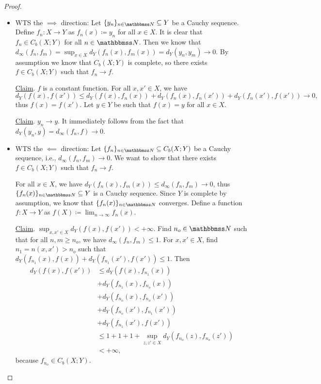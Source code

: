 \documentclass[screen,single]{techreport}
\numberwithin{equation}{section}
\begin{document}
\begin{proof}\
  \begin{itemize}
    \item WTS the $\implies$ direction:
    Let $\{y_n\}_{n \in \bbN} \subseteq Y$ be a Cauchy sequence.
    Define $f_n : X \to Y$ as $f_n(x) \coloneqq y_n$ for all $x \in X$.
    It is clear that $f_n \in C_b(X;Y)$ for all $n \in \bbN$.
    Then we know that $d_\infty(f_n,f_m) = \sup_{x \in X} d_Y(f_n(x),f_m(x)) = d_Y(y_n,y_m) \rightarrow 0$.
    By assumption we know that $C_b(X;Y)$ is complete, so there exists $f \in C_b(X;Y)$ such that $f_n \rightarrow f$.
    
    \underline{Claim}. $f$ is a constant function.
    For all $x,x' \in X$, we have
    \[
    d_Y(f(x), f(x')) \le d_Y(f(x),f_n(x)) + d_Y(f_n(x),f_n(x')) + d_Y(f_n(x'), f(x')) \rightarrow 0,
    \]
    thus $f(x) = f(x')$.
    Let $y \in Y$ be such that $f(x) = y$ for all $x \in X$.
    
    \underline{Claim}. $y_n \rightarrow y$.
    It immediately follows from the fact that $d_Y(y_n,y) = d_\infty(f_n,f) \rightarrow 0$.
    
    \item WTS the $\impliedby$ direction:
    Let $\{f_n\}_{n \in \bbN} \subseteq C_b(X;Y)$ be a Cauchy sequence, i.e., $d_\infty(f_n,f_m) \rightarrow 0$.
    We want to show that there exists $f \in C_b(X;Y)$ such that $f_n \rightarrow f$.
    
    For all $x \in X$, we have $d_Y(f_n(x),f_m(x)) \le d_\infty(f_n,f_m) \rightarrow 0$, thus $\{f_n(x)\}_{n \in \bbN} \subseteq Y$ is a Cauchy sequence.
    Since $Y$ is complete by assumption, we know that $\{f_n(x)\}_{n \in \bbN}$ converges.
    Define a function $f : X \to Y$ as $f(X) \coloneqq \lim_{n \to \infty} f_n(x)$.
    
    \underline{Claim}. $\sup_{x,x' \in X} d_Y(f(x),f(x')) < +\infty$.
    Find $n_o \in \bbN$ such that for all $n,m \ge n_o$, we have $d_\infty(f_n,f_m) \le 1$.
    For $x,x' \in X$, find $n_1 = n(x,x') > n_o$ such that $d_Y(f_{n_1}(x),f(x)) + d_Y(f_{n_1}(x'), f(x')) \le 1$.
    Then
    \begin{align*}
      d_Y(f(x),f(x')) & \le d_Y(f(x),f_{n_1}(x)) \\
      & + d_Y(f_{n_1}(x), f_{n_o}(x)) \\
      & + d_Y(f_{n_o}(x), f_{n_o}(x')) \\
      & + d_Y(f_{n_o}(x'), f_{n_1}(x')) \\
      & + d_Y(f_{n_1}(x'), f(x')) \\
      & \le 1 + 1 + 1 + \sup_{z,z'\in X} d_Y(f_{n_o}(z),f_{n_o}(z')) \\
      & < +\infty,  
    \end{align*}
    because $f_{n_o} \in C_b(X;Y)$.
    

\end{itemize}
\end{proof}
\end{document}
